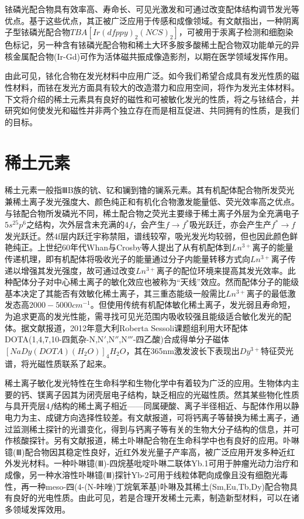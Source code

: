 \documentclass[UTF8,a4paper,10pt,twocolumn]{ctexart}
\begin{document}
铱磷光配合物具有效率高、寿命长、可见光激发和可通过改变配体结构调节发光等优点。基于这些优点，其正被广泛应用于传感和成像领域。有文献指出，一种阴离子型铱磷光配合物$TBA[Ir(dfppy)_2(NCS)_2]$，可被用于汞离子检测和细胞染色标记，另一种含有铱磷光配合物和稀土大环多胺多酸稀土配合物双功能单元的异核金属配合物(Ir-Gd)可作为活体磁共振成像造影剂，以期在医学领域发挥作用。

由此可见，铱化合物在发光材料中应用广泛。如今我们希望合成具有发光性质的磁性材料，而铱在发光方面具有较大的改造潜力和应用空间，将作为发光主体材料。下文将介绍的稀土元素具有良好的磁性和可被敏化发光的性质，将之与铱结合，并研究如何使发光和磁性并非两个独立存在而是相互促进、共同拥有的性质，是我们的目标。

\section{稀土元素}
稀土元素一般指ⅢB族的钪、钇和镧到镥的镧系元素。其有机配体配合物所发荧光兼稀土离子发光强度大、颜色纯正和有机化合物激发能量低、荧光效率高之优点。与铱配合物所发磷光不同，稀土配合物之荧光主要缘于稀土离子外层为全充满电子$5s^25p^6$之结构，次外层含未充满的$4f$，会产生$f \rightarrow f^*$吸光跃迁，亦会产生产$f^* \rightarrow f$发光跃迁。然4f层内跃迁宇称禁阻，谱线较窄，吸光发光均较弱，但也因此颜色鲜艳纯正。上世纪60年代Whan与Crosby等人提出了从有机配体到$Ln^{3+}$离子的能量传递机理，即有机配体将吸收光子的能量通过分子内能量转移方式向$Ln^{3+}$离子传递以增强其发光强度，故可通过改变$Ln^{3+}$离子的配位环境来提高其发光效率。此种配体分子对中心稀土离子的敏化效应也被称为“天线”效应。然而配体分子的能级基本决定了其能否有效敏化稀土离子，其三重态能级一般需比$Ln^{3+}$离子的最低激发态高$2000-5000cm^{-1}$。但使用传统有机配体敏化稀土离子，发光弱且寿命短，为追求更高的发光性能，需寻找可见光范围内吸收较强且能级适合敏化发光的配体。据文献报道，2012年意大利Roberta Sessoli课题组利用大环配体DOTA(1,4,7,10-四氮杂-N,N$'$,N$''$,N$'''$-四乙酸)合成得单分子磁体$[Na{Dy(DOTA)(H_2O)}]_4H_2O$，其在365nm激发波长下表现出$Dy^{3+}$特征荧光谱，将光磁性质联系了起来。 

稀土离子敏化发光特性在生命科学和生物化学中有着较为广泛的应用。生物体内主要的钙、镁离子因其为闭壳层电子结构，缺乏相应的光磁性质。然其某些物化性质与具开壳层$4f$结构的稀土离子相近——同属硬酸、离子半径相近、与配体作用以静电力为主、成键方向选择性较差。有文献报道，可将钙离子等替换为稀土离子，通过监测稀土探针的光谱变化，得到与钙离子等有关的生物大分子结构的信息，并可作核酸探针。另有文献报道，稀土卟啉配合物在生命科学中也有良好的应用。卟啉镱(Ⅲ)配合物因其稳定性良好，近红外发光量子产率高，被广泛应用开发多种近红外发光材料。一种卟啉镱(Ⅲ)-四烷基吡啶卟啉二联体Yb.1可用于肿瘤光动力治疗和成像，另一种水溶性卟啉镱(Ⅲ)探针Yb-2可用于线粒体靶向成像且没有细胞光毒性，再一种meso-四(4-(N-咔唑)丁烷氧苯基)卟啉及其稀土(Sm,Eu,Tb,Dy)配合物具有良好的光电性质。由此可见，若是合理开发稀土元素，制造新型材料，可以在诸多领域发挥效用。
\end{document}
